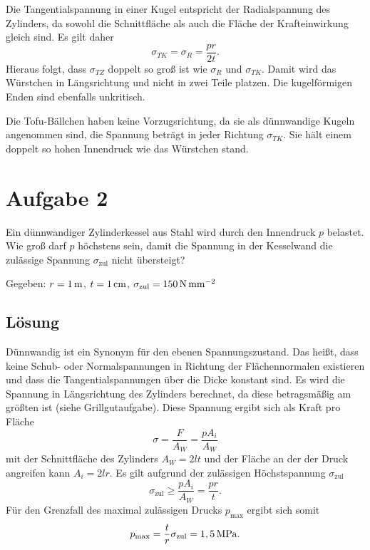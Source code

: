 \documentclass{exercise}
\begin{document}
    Die Tangentialspannung in einer Kugel entspricht der Radialspannung des Zylinders, da sowohl die Schnittfläche als auch die Fläche der Krafteinwirkung gleich sind.
    Es gilt daher
    \[
        \sigma_{TK} = \sigma_R = \frac{pr}{2t}.
    \]
    Hieraus folgt, dass \(\sigma_{TZ}\) doppelt so groß ist wie \(\sigma_R\) und \(\sigma_{TK}\).
    Damit wird das Würstchen in Längsrichtung und nicht in zwei Teile platzen.
    Die kugelförmigen Enden sind ebenfalls unkritisch.

    Die Tofu-Bällchen haben keine Vorzugsrichtung, da sie als dünnwandige Kugeln angenommen sind, die Spannung beträgt in jeder Richtung \(\sigma_{TK}\).
    Sie hält einem doppelt so hohen Innendruck wie das Würstchen stand.


    \clearpage
    \section*{Aufgabe 2}

    \begin{problem}
        Ein dünnwandiger Zylinderkessel aus Stahl wird durch den Innendruck \(p\) belastet.
        Wie groß darf \(p\) höchstens sein, damit die Spannung in der Kesselwand die zulässige Spannung \(\sigma_{\text{zul}}\) nicht übersteigt?

        Gegeben: \(r = 1\,\si{\meter}\), \(t = 1\,\si{\centi\meter}\), \(\sigma_{\text{zul}} = 150\,\si{\newton\per\milli\meter\squared}\)
    \end{problem}

    \subsection*{Lösung}
    Dünnwandig ist ein Synonym für den ebenen Spannungszustand.
    Das heißt, dass keine Schub- oder Normalspannungen in Richtung der Flächennormalen existieren und dass die Tangentialspannungen über die Dicke konstant sind.
    Es wird die Spannung in Längsrichtung des Zylinders berechnet, da diese betragsmäßig am größten ist (siehe Grillgutaufgabe).
    Diese Spannung ergibt sich als Kraft pro Fläche
    \[
        \sigma = \frac{F}{A_W} = \frac{pA_i}{A_W}
    \]
    mit der Schnittfläche des Zylinders \(A_W = 2lt\) und der Fläche an der der Druck angreifen kann \(A_i = 2lr\).
    Es gilt aufgrund der zulässigen Höchstspannung \(\sigma_{\text{zul}}\)
    \[
        \sigma_{\text{zul}} \ge \frac{pA_i}{A_W} = \frac{pr}{t}.
    \]
    Für den Grenzfall des maximal zulässigen Drucks \(p_{\text{max}}\) ergibt sich somit
    \[
        p_{\text{max}} = \frac{t}{r}\sigma_{\text{zul}} = 1,5\,\si{\mega\pascal}.
    \]
\end{document}
